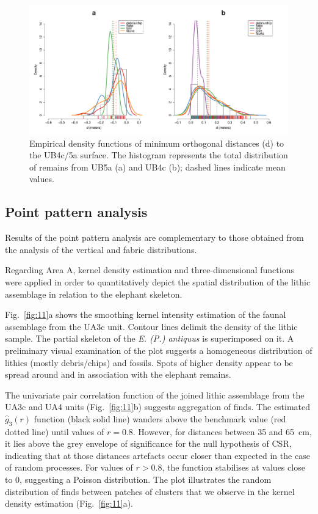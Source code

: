 \documentclass[preprint,authoryear,times]{elsarticle} %
\begin{document}
\begin{figure}[]
  \centering
  \includegraphics[width=1\textwidth]{../artwork/Fig10.pdf}
  \caption{Empirical density functions of minimum orthogonal distances (d) to the UB4c/5a surface. The histogram represents the total distribution of remains from UB5a (a) and UB4c (b); dashed lines indicate mean values.}
  \label{fig:10}
\end{figure}

\subsection{Point pattern analysis}

Results of the point pattern analysis are complementary to those obtained from the analysis of the vertical and fabric distributions.  


Regarding Area A, kernel density estimation and three-dimensional functions were applied in order to quantitatively depict the spatial distribution of the lithic assemblage in relation to the elephant skeleton.

Fig.~\ref{fig:11}a shows the smoothing kernel intensity estimation of the %
faunal assemblage from the UA3c unit. Contour lines delimit the density of the lithic sample. The partial skeleton of the \emph{E. (P.) antiquus} is superimposed on it. A preliminary visual examination of the plot suggests a homogeneous distribution of lithics (mostly debris/chips) and fossils. Spots of higher density appear to be spread around and in association with the elephant remains.

The univariate pair correlation function of the joined lithic assemblage from the UA3c and UA4 units (Fig.~\ref{fig:11}b) suggests aggregation of finds. The estimated $\hat{g}_3(r)$ function (black solid line) wanders above the benchmark value (red dotted line) until values of $r=0.8$. However, for distances between 35 and 65~cm, it lies above the grey envelope of significance for the null hypothesis of CSR, indicating that at those distances artefacts occur closer than expected in the case of random processes. For values of $r>0.8$, the function stabilises at values close to 0, suggesting a Poisson distribution. The plot illustrates the random distribution of finds between patches of clusters that we observe in the kernel density estimation (Fig.~\ref{fig:11}a).
\end{document}
